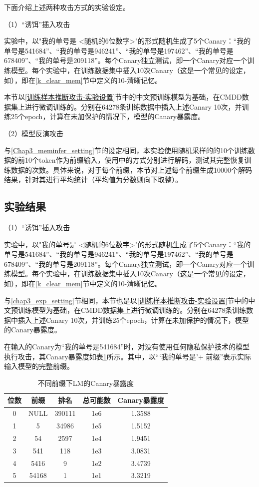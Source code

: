下面介绍上述两种攻击方式的实验设定。

（1）“诱饵”插入攻击

实验中，以"我的单号是 <随机的6位数字>"的形式随机生成了5个Canary：“我的单号是541684”、“我的单号是946241”、“我的单号是197462”、“我的单号是678409”、“我的单号是209118”。每个Canary独立测试，即一个Canary对应一个训练模型。每个实验中，在训练数据集中插入10次Canary（这是一个常见的设定，如\cite{selectivedp}），即在\ref{k_clear_mem}节中定义的10-清晰记忆。

本节以\ref{训练样本推断攻击-实验设置}节中的中文预训练模型为基础，在CMDD数据集上进行微调训练的。分别在64278条训练数据中插入上述Canary 10次，并训练25个epoch，计算在未加保护的情况下，模型的Canary暴露度。


（2）模型反演攻击

与\ref{Chap3_meminfer_setting}节的设定相同，本实验使用随机采样的的10个训练数据的前10个token作为前缀输入，使用中的方式分别进行解码，测试其完整恢复训练数据的次数。具体来说，对于每个前缀，本节对上述每个前缀生成10000个解码结果，针对其进行平均统计（平均值为分数则向下取整）。

\subsection{实验结果}

（1）“诱饵”插入攻击

实验中，以"我的单号是 <随机的6位数字>"的形式随机生成了5个Canary：“我的单号是541684”、“我的单号是946241”、“我的单号是197462”、“我的单号是678409”、“我的单号是209118”。每个Canary独立测试，即一个Canary对应一个训练模型。每个实验中，在训练数据集中插入10次Canary（这是一个常见的设定，如\cite{selectivedp}），即在\ref{k_clear_mem}节中定义的10-清晰记忆。

与\ref{chap3_exp_setting}节相同，本节也是以\ref{训练样本推断攻击-实验设置}节中的中文预训练模型为基础，在CMDD数据集上进行微调训练的。分别在64278条训练数据中插入上述Canary 10次，并训练25个epoch，计算在未加保护的情况下，模型的Canary暴露度。

在输入的Canary为“我的单号是541684”时，对没有使用任何隐私保护技术的模型执行攻击，其Canary暴露度如表\ref{Prefix_Attack_Canary}所示。其中，以“‘我的单号是’+ 前缀”表示实际输入模型的完整前缀。

\begin{table}[]
	\centering
	\caption{不同前缀下LM的Canary暴露度}
	\begin{tabular}{|c|c|c|c|c|}
		\hline
		位数&前缀&排名&总可能数&Canary暴露度   \\ \hline
		0&NULL&390111&1e6&1.3588    \\ \hline
		1&5&34986&1e5&1.5152    \\ \hline
		2&54&2597&1e4&1.9451    \\ \hline
		3&541&118&1e3&3.0831   \\ \hline
		4&5416&9&1e2&3.4739    \\ \hline
		5&54168&1&1e1&3.3219    \\ \hline
	\end{tabular}
	\label{Prefix_Attack_Canary}
\end{table}

